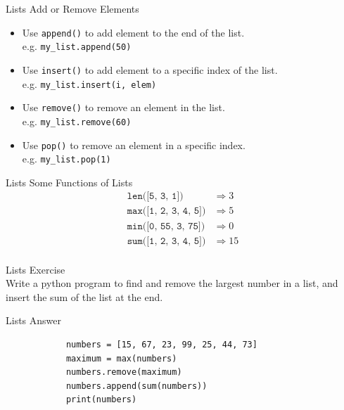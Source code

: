 \documentclass{beamer}
\begin{document}
    \begin{frame}{Lists}
        \color{blue} \Large Add or Remove Elements \\
        \color{black} \normalsize \vskip 5pt
        \begin{itemize}
            \item Use \texttt{append()} to add element to the end of the list. \\
                  e.g. \texttt{my\_list.append(50)} 
            \item Use \texttt{insert()} to add element to a specific index of the list. \\
                  e.g. \texttt{my\_list.insert(i, elem)}
            \item Use \texttt{remove()} to remove an element in the list. \\
                  e.g. \texttt{my\_list.remove(60)}
            \item Use \texttt{pop()} to remove an element in a specific index. \\
                  e.g. \texttt{my\_list.pop(1)}
        \end{itemize}
        
    \end{frame}
    
    \begin{frame}{Lists}
        \color{blue} \Large Some Functions of Lists \\
        \color{black} \normalsize \vskip 5pt
        \begin{align*}
            \texttt{len([5, 3, 1])} &\Rightarrow 3 \\
            \texttt{max([1, 2, 3, 4, 5])} &\Rightarrow 5 \\
            \texttt{min([0, 55, 3, 75])} &\Rightarrow 0 \\
            \texttt{sum([1, 2, 3, 4, 5])} &\Rightarrow 15 \\
        \end{align*}
    \end{frame}

    \begin{frame}{Lists}
        \color{blue} \Large Exercise \\
        \color{black} \normalsize \vskip 10pt
        Write a python program to find and remove the largest number in 
        a list, and insert the sum of the list at the end.
    \end{frame}

    \begin{frame}[fragile]{Lists}
        \color{blue} \Large Answer \\
        \color{black} \normalsize \vskip 10pt
        \begin{verbatim}
            numbers = [15, 67, 23, 99, 25, 44, 73]
            maximum = max(numbers)
            numbers.remove(maximum)
            numbers.append(sum(numbers))
            print(numbers)
        \end{verbatim}
    \end{frame}
    
\end{document}
